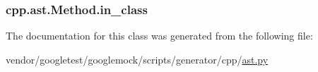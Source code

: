 \subsubsection[{\texorpdfstring{in\+\_\+class}{in_class}}]{\setlength{\rightskip}{0pt plus 5cm}cpp.\+ast.\+Method.\+in\+\_\+class}\hypertarget{classcpp_1_1ast_1_1Method_aa67244c3673afed43398b5d3e3fa6c1c}{}\label{classcpp_1_1ast_1_1Method_aa67244c3673afed43398b5d3e3fa6c1c}


The documentation for this class was generated from the following file\+:\begin{DoxyCompactItemize}
\item 
vendor/googletest/googlemock/scripts/generator/cpp/\hyperlink{ast_8py}{ast.\+py}\end{DoxyCompactItemize}
